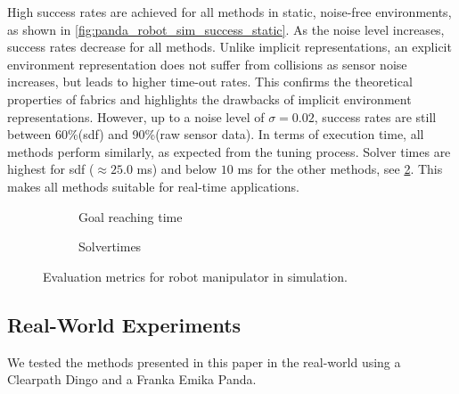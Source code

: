 High success rates are achieved for all methods in static,
noise-free environments, as shown in \cref{fig:panda_robot_sim_success_static}.
As the noise level increases, success rates decrease for all
methods. Unlike implicit representations, an explicit environment
representation does not suffer from collisions as sensor
noise increases, but leads to higher time-out rates. This
confirms the theoretical properties of \ac{fabrics} and
highlights the drawbacks of implicit environment
representations. However, up to a noise level of
$\sigma=0.02$, success rates are still between
60\%(\ac{sdf}) and 90\%(raw sensor data). In terms of
execution time, all methods perform similarly, as expected
from the tuning process. Solver times are highest for
\ac{sdf} ($\approx 25.0$ ms) and below $10$ ms for the 
other methods, see \cref{subfig:panda_sim_solvertimes}.
This makes all methods suitable for real-time applications.
%
\begin{figure}[ht]
  \centering
  \begin{subfigure}{0.5\linewidth}
    \centering
    
    \caption{Goal reaching time}%
    \label{subfig:panda_sim_time2Goal}
  \end{subfigure}%
  \begin{subfigure}{0.5\linewidth}
    \centering
    
    \caption{Solvertimes}%
    \label{subfig:panda_sim_solvertimes}
  \end{subfigure}%
  \caption{Evaluation metrics for robot manipulator in
    simulation.
  }%
  \label{fig:panda_sim_metrics}
\end{figure}

\subsection{Real-World Experiments} %
\label{sub:real_world_experiments}
%
We tested the methods presented in this paper in the
real-world using a Clearpath Dingo and a Franka
Emika Panda. 

